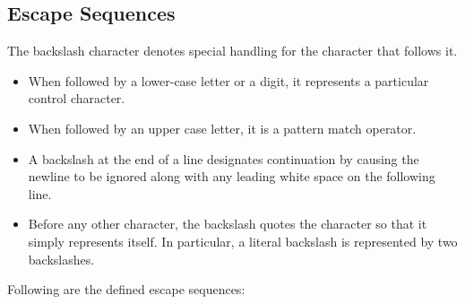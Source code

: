 \subsection{Escape Sequences}
The backslash character denotes special handling for the character that
follows it.
\begin{itemize}
\item When followed by a lower-case letter or a digit, it
represents a particular control character.
\item When followed by an upper
case letter, it is a pattern match operator.
\item A backslash at the end of
a line designates continuation by causing the newline to be ignored
along with any leading white space on the following line.
\item Before any other character, the backslash quotes the character so that
it simply represents itself.  In particular, a literal backslash is
represented by two backslashes.
\end{itemize}

Following are the defined escape sequences:

